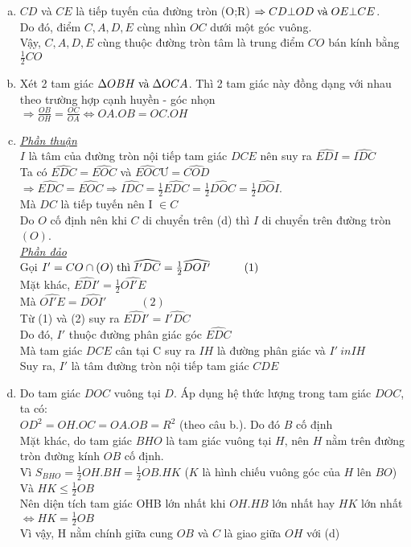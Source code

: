 \begin{enumerate}[a.]
\item $CD$ và $CE$ là tiếp tuyến của đường tròn (O;R) $ \Rightarrow CD \bot OD\text{\;và\;}OE \bot CE$.\\
Do đó, điểm $C, A, D, E$ cùng nhìn $OC$ dưới một góc vuông.\\
Vậy, $C, A, D, E$ cùng thuộc đường tròn tâm là trung điểm $CO$ bán kính bằng $\frac{1}{2}CO$
\item Xét 2 tam giác $\Delta OBH\text{\;và\;}\Delta OCA$. Thì 2 tam giác này đồng dạng với nhau theo trường hợp cạnh huyền - góc nhọn\\
$ \displaystyle\Rightarrow \frac{{OB}}{{OH}} = \displaystyle\frac{{OC}}{{OA}} \Leftrightarrow OA.OB = OC.OH$
\item \underline{\textit{Phần thuận}}\\
$I$ là tâm của đường tròn nội tiếp tam giác $DCE$ nên suy ra $\widehat {EDI} = \widehat {IDC}$\\
Ta có $\widehat{EDC}=\widehat{EOC}$ và $\widehat{EOC}Ư=\widehat{COD}$\\
$\Rightarrow \widehat {EDC} = \widehat {EOC} \Rightarrow \widehat {IDC} = \frac{1}{2}\widehat {EDC} = \frac{1}{2}\widehat {DOC} = \frac{1}{2}\widehat {DOI}$.\\
Mà $DC$ là tiếp tuyến nên I $\in C$\\
Do $O$ cố định nên khi $C$ di chuyển trên (d) thì $I$ di chuyển trên đường tròn $(O)$.\\
\underline{\textit{Phần đảo}}\\
Gọi $
  I' = CO \cap (O) \text{\;thì\;} \widehat {I'DC} = \frac{1}{2}\widehat {DOI'}\quad \quad \quad(1) $\\
Mặt khác, $\widehat {EDI'} = \frac{1}{2}\widehat {OI'E}$\\
Mà $\widehat {OI'E} = \widehat {DOI'}\quad \quad \quad(2)$\\
Từ (1) và (2) suy ra $\widehat {EDI'} = \widehat {I'DC}$\\
Do đó, $I'$ thuộc đường phân giác góc $\widehat{EDC}$\\
Mà tam giác $DCE$ cân tại C suy ra $IH$ là đường phân giác  và $I' \ in  IH$\\
Suy ra, $I'$ là tâm đường tròn nội tiếp tam giác $CDE$
\item Do tam giác $DOC$ vuông tại $D$. Áp dụng hệ thức lượng trong tam giác $DOC$, ta có:\\
$OD^{2} = OH. OC = OA. OB = R^{2}$ (theo câu b.). Do đó $B$ cố định\\
Mặt khác, do tam giác $BHO$ là tam giác vuông tại $H$, nên $H$ nằm trên đường tròn đường kính $OB$ cố định.\\
Vì ${S_{BHO}} = \frac{1}{2}OH.BH = \frac{1}{2}OB.HK$ ($K$ là hình chiếu vuông góc của $H$ lên $BO$)\\
Và $HK \leqslant \frac{1}{2}OB$\\
Nên diện tích tam giác OHB lớn nhất khi $OH. HB$ lớn nhất hay $HK$ lớn nhất $\Longleftrightarrow HK = \frac{1}{2}OB$\\
Vì vậy, H nằm chính giữa cung $OB$ và $C$ là giao giữa $OH$ với (d)
\end{enumerate}
